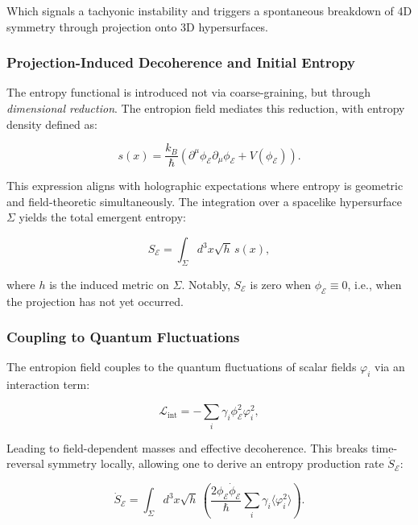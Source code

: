 \documentclass[12pt]{article}
\begin{document}
Which signals a tachyonic instability and triggers a spontaneous breakdown of 4D symmetry through projection onto 3D hypersurfaces.

\subsubsection*{Projection-Induced Decoherence and Initial Entropy}

The entropy functional is introduced not via coarse-graining, but through \emph{dimensional reduction}. The entropion field mediates this reduction, with entropy density defined as:

\begin{equation}
\label{eq:entropy_density_field}
s(x) = \frac{k_B}{\hbar} \left( \partial^\mu \phi_{\mathcal{E}} \partial_\mu \phi_{\mathcal{E}} + V(\phi_{\mathcal{E}}) \right).
\end{equation}

This expression aligns with holographic expectations where entropy is geometric and field-theoretic simultaneously. The integration over a spacelike hypersurface \(\Sigma\) yields the total emergent entropy:

\begin{equation}
\label{eq:total_entropy_emergence}
S_{\mathcal{E}} = \int_{\Sigma} d^3x \sqrt{h} \, s(x),
\end{equation}

where \(h\) is the induced metric on \(\Sigma\). Notably, \(S_{\mathcal{E}}\) is zero when \(\phi_{\mathcal{E}} \equiv 0\), i.e., when the projection has not yet occurred.

\subsubsection*{Coupling to Quantum Fluctuations}

The entropion field couples to the quantum fluctuations of scalar fields \(\varphi_i\) via an interaction term:

\begin{equation}
\label{eq:entropion_scalar_coupling}
\mathcal{L}_{\text{int}} = - \sum_i \gamma_i \phi_{\mathcal{E}}^2 \varphi_i^2,
\end{equation}

Leading to field-dependent masses and effective decoherence. This breaks time-reversal symmetry locally, allowing one to derive an entropy production rate \(\dot{S}_{\mathcal{E}}\):

\begin{equation}
\label{eq:entropy_production_rate}
\dot{S}_{\mathcal{E}} = \int_{\Sigma} d^3x \sqrt{h} \, \left( \frac{2\phi_{\mathcal{E}} \dot{\phi}_{\mathcal{E}}}{\hbar} \sum_i \gamma_i \langle \varphi_i^2 \rangle \right).
\end{equation}
\end{document}
